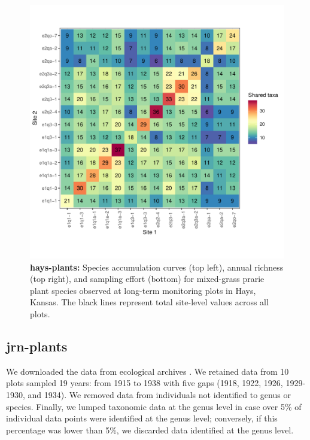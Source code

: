\documentclass[11pt, oneside]{article}
\begin{document}
\begin{figure}[h!]
\includegraphics[scale = 0.4]{hays-plants-compagnoni_spp_shared.pdf}
\caption{{\bf hays-plants:} Species accumulation curves (top left),  annual richness (top right), and sampling effort (bottom)  for mixed-grass prarie plant species observed at long-term monitoring plots in Hays, Kansas. The black lines represent total site-level values across all plots.}
\label{hays-plants}
\end{figure}

\subsection{jrn-plants}
We downloaded the data from ecological archives \citep{anderson_cover_2012}. We retained data from 10 plots sampled 19 years: from 1915 to 1938 with five gaps (1918, 1922, 1926, 1929-1930, and 1934). We removed data from individuals not identified to genus or species. Finally, we lumped taxonomic data at the genus level in case over 5\% of individual data points were identified at the genus level; conversely, if this percentage was lower than 5\%, we discarded data identified at the genus level.
\end{document}
